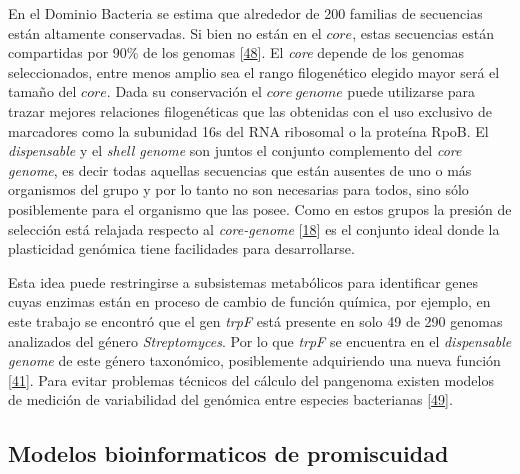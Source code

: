 \documentclass[12pt,twoside]{reedthesis}
\begin{document}
  En el Dominio Bacteria se estima que alrededor de 200 familias de
  secuencias están altamente conservadas. Si bien no están en el \(core\),
  estas secuencias están compartidas por 90\% de los genomas
  {[}\protect\hyperlink{ref-halachev_calculating_2011}{48}{]}. El
  \emph{core} depende de los genomas seleccionados, entre menos amplio sea
  el rango filogenético elegido mayor será el tamaño del \(core\). Dada su
  conservación el \(core~genome\) puede utilizarse para trazar mejores
  relaciones filogenéticas que las obtenidas con el uso exclusivo de
  marcadores como la subunidad 16s del RNA ribosomal o la proteína RpoB.
  El \emph{dispensable} y el \emph{shell genome} son juntos el conjunto
  complemento del \emph{core genome}, es decir todas aquellas secuencias
  que están ausentes de uno o más organismos del grupo y por lo tanto no
  son necesarias para todos, sino sólo posiblemente para el organismo que
  las posee. Como en estos grupos la presión de selección está relajada
  respecto al \emph{core-genome}
  {[}\protect\hyperlink{ref-firn_darwinian_2009}{18}{]} es el conjunto
  ideal donde la plasticidad genómica tiene facilidades para
  desarrollarse.
  
  Esta idea puede restringirse a subsistemas metabólicos para identificar
  genes cuyas enzimas están en proceso de cambio de función química, por
  ejemplo, en este trabajo se encontró que el gen \emph{trpF} está
  presente en solo 49 de 290 genomas analizados del género
  \emph{Streptomyces}. Por lo que \emph{trpF} se encuentra en el
  \emph{dispensable genome} de este género taxonómico, posiblemente
  adquiriendo una nueva función
  {[}\protect\hyperlink{ref-ma_unconventional_2013}{41}{]}. Para evitar
  problemas técnicos del cálculo del pangenoma existen modelos de medición
  de variabilidad del genómica entre especies bacterianas
  {[}\protect\hyperlink{ref-kislyuk_genomic_2011}{49}{]}.
  
  \subsection{Modelos bioinformaticos de
  promiscuidad}\label{modelos-bioinformaticos-de-promiscuidad}
  
\end{document}
